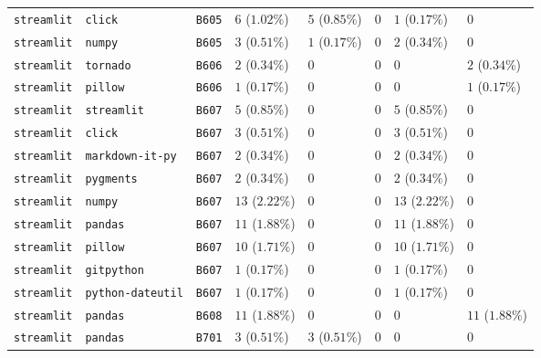 \begin{table}
\begin{tabular}{llllllll}
\texttt{streamlit} & \texttt{click} & \texttt{B605} & $6$ ($1.02\%$) & $5$ ($0.85\%$) & $0$ & $1$ ($0.17\%$) & $0$ \\
\texttt{streamlit} & \texttt{numpy} & \texttt{B605} & $3$ ($0.51\%$) & $1$ ($0.17\%$) & $0$ & $2$ ($0.34\%$) & $0$ \\
\texttt{streamlit} & \texttt{tornado} & \texttt{B606} & $2$ ($0.34\%$) & $0$ & $0$ & $0$ & $2$ ($0.34\%$) \\
\texttt{streamlit} & \texttt{pillow} & \texttt{B606} & $1$ ($0.17\%$) & $0$ & $0$ & $0$ & $1$ ($0.17\%$) \\
\texttt{streamlit} & \texttt{streamlit} & \texttt{B607} & $5$ ($0.85\%$) & $0$ & $0$ & $5$ ($0.85\%$) & $0$ \\
\texttt{streamlit} & \texttt{click} & \texttt{B607} & $3$ ($0.51\%$) & $0$ & $0$ & $3$ ($0.51\%$) & $0$ \\
\texttt{streamlit} & \texttt{markdown-it-py} & \texttt{B607} & $2$ ($0.34\%$) & $0$ & $0$ & $2$ ($0.34\%$) & $0$ \\
\texttt{streamlit} & \texttt{pygments} & \texttt{B607} & $2$ ($0.34\%$) & $0$ & $0$ & $2$ ($0.34\%$) & $0$ \\
\texttt{streamlit} & \texttt{numpy} & \texttt{B607} & $13$ ($2.22\%$) & $0$ & $0$ & $13$ ($2.22\%$) & $0$ \\
\texttt{streamlit} & \texttt{pandas} & \texttt{B607} & $11$ ($1.88\%$) & $0$ & $0$ & $11$ ($1.88\%$) & $0$ \\
\texttt{streamlit} & \texttt{pillow} & \texttt{B607} & $10$ ($1.71\%$) & $0$ & $0$ & $10$ ($1.71\%$) & $0$ \\
\texttt{streamlit} & \texttt{gitpython} & \texttt{B607} & $1$ ($0.17\%$) & $0$ & $0$ & $1$ ($0.17\%$) & $0$ \\
\texttt{streamlit} & \texttt{python-dateutil} & \texttt{B607} & $1$ ($0.17\%$) & $0$ & $0$ & $1$ ($0.17\%$) & $0$ \\
\texttt{streamlit} & \texttt{pandas} & \texttt{B608} & $11$ ($1.88\%$) & $0$ & $0$ & $0$ & $11$ ($1.88\%$) \\
\texttt{streamlit} & \texttt{pandas} & \texttt{B701} & $3$ ($0.51\%$) & $3$ ($0.51\%$) & $0$ & $0$ & $0$ \\
\bottomrule
\end{tabular}
\end{table}
